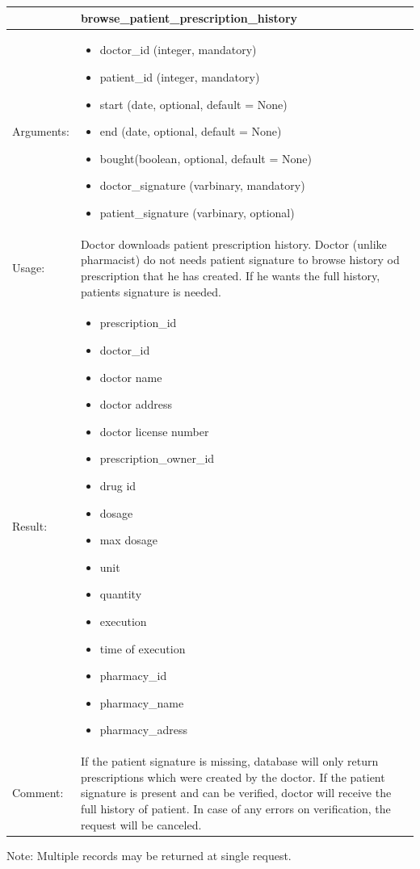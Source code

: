 \begin{table}[h]
    \begin{tabular}{| p{6cm} | p{7.75cm} |}
    \hline
     & browse\_patient\_prescription\_history \\ \hline
    Arguments: &  \begin{itemize}
    	\item doctor\_id (integer, mandatory)
		\item patient\_id (integer, mandatory)
		\item start (date, optional, default = None)
		\item end (date, optional, default = None)
		\item bought(boolean, optional, default = None)
		\item doctor\_signature (varbinary, mandatory)
		\item patient\_signature (varbinary, optional)

	\end{itemize}     \\ \hline
    Usage: & Doctor downloads patient prescription history. Doctor (unlike pharmacist) do not needs patient signature to browse history od prescription that he has created. If he wants the full history, patients signature is needed. \\ \hline
    Result: & \begin{itemize}
    	\item prescription\_id
    	\item doctor\_id
    	\item doctor name
    	\item doctor address
    	\item doctor license number
    	\item prescription\_owner\_id
    	\item drug id
    	\item dosage
    	\item max dosage
    	\item unit
    	\item quantity
    	\item execution
    	\item time of execution
    	\item pharmacy\_id
    	\item pharmacy\_name
    	\item pharmacy\_adress
	\end{itemize}     \\ \hline
	Comment: & If the patient signature is missing, database will only return prescriptions which were created by the doctor. If the patient signature is present and can be verified, doctor will receive the full history of patient. In case of any errors on verification, the request will be canceled. \\ \hline
    \end{tabular}
\end{table}Note: Multiple records may be returned at single request.

